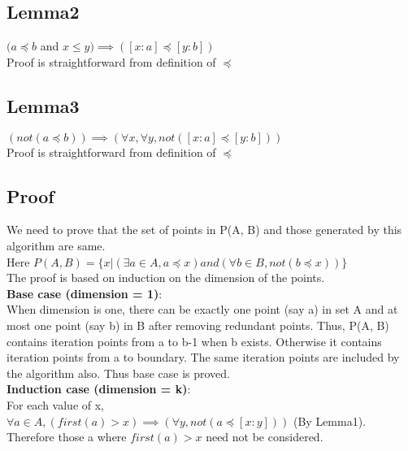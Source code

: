 \subsection{Lemma2}
{$(a \preceq b$ and $x \leq y) \implies ([x:a] \preceq [y:b])$\\
Proof is straightforward from definition of $\preceq$\\

\subsection{Lemma3}
$(not(a \preceq b)) \implies (\forall x,\forall y, not([x:a] \preceq [y:b]))$\\
Proof is straightforward from definition of $\preceq$\\

\subsection{Proof}

We need to prove that the set of points in P(A, B) and those generated by this algorithm are same. \\
Here $P(A,B) = \{x | ( \exists a \in A, a \preceq x) and (\forall b \in B, not(b \preceq x))\}$ \\

The proof is based on induction on the dimension of the points.\\

\noindent \textbf{Base case (dimension = 1)}:\\

When dimension is one, there can be exactly one point (say a) in set A and at most one point (say b) in B after removing redundant points. Thus, P(A, B) contains iteration points from a to b-1 when b exists. Otherwise it contains iteration points from a to boundary. The same iteration points are included by the algorithm also. Thus base case is proved.\\

\noindent \textbf{Induction case (dimension = k)}:\\

\noindent For each value of x, \\
$\forall a \in A, (first(a) > x) \implies (\forall y, not(a \preceq [x:y]))$ (By Lemma1). \\
Therefore those a where $first(a) > x$ need not be considered.\\

}
